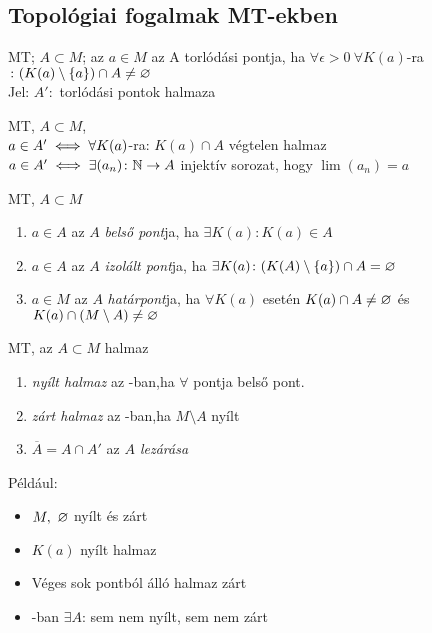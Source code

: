\subsection{Topológiai fogalmak MT-ekben}
\begin{de}
  \MT MT; $A\subset M$; az $a\in M$ az A torlódási pontja, ha
  $\forall \epsilon >0\  \forall K(a)$-ra$\colon (K(a)\setminus\{a\})
  \cap A \neq \varnothing$\\
  Jel: $A'\colon$ torlódási pontok halmaza
\end{de}

\begin{te}
  \MT MT, $A\subset M$,\\
  $a\in A' \iff \forall K(a)$-ra: $K(a)\cap A$ végtelen
  halmaz\\
  $a\in A' \iff \exists (a_n)\colon \mathbb{N}\to A$ injektív sorozat, hogy
  $\lim(a_n)=a$
\end{te}
\begin{de} \MT MT, $A\subset M$
  \begin{enumerate}
  \item $a\in A$ az $A$ \emph{belső pont}ja, ha $\exists K(a)\colon
    K(a)\in A$
  \item $a\in A$ az $A$ \emph{izolált pont}ja, ha $\exists
    K(a)\colon  (K(A)\setminus\{a\}) \cap A = \varnothing$
  \item $a\in M$ az $A$ \emph{határpont}ja, ha $\forall K(a)$
    esetén $K(a)\cap A \neq \varnothing$ és $K(a)\cap (M\setminus
    A) \neq \varnothing$
  \end{enumerate}
\end{de}

\begin{de} \MT MT, az $A\subset M$ halmaz
  \begin{enumerate}
  \item \emph{nyílt halmaz} az \MT-ban,ha $\forall$ pontja
    belső pont.
  \item \emph{zárt halmaz} az \MT-ban,ha $M\setminus A$ nyílt
  \item $\overline{\!A}=A\cap A'$ az \emph{$A$ lezárása}
  \end{enumerate}
\end{de}
\newpage%
Például:
\begin{itemize}
\item $M,\ \varnothing$ nyílt és zárt
\item $K(a)$ nyílt halmaz
\item Véges sok pontból álló halmaz zárt
\item \MT-ban $\exists A$: sem nem nyílt, sem nem zárt
\end{itemize}

